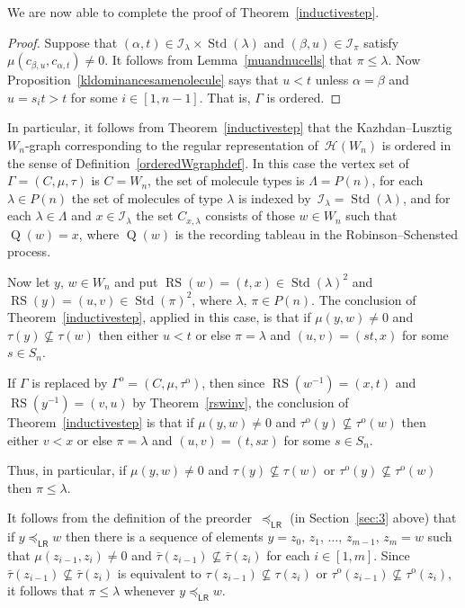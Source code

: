 \documentclass[ALCO,ThmDefs,Unicode,epreuves]{cedram}
\DeclareMathOperator{\orm}{o}
\newcommand{\opp}{^{\orm}}
\newcommand{\leftright}{_{\mathsf{LR}}}
\DeclareMathOperator{\STD}{Std}
\DeclareMathOperator{\RS}{RS}
\DeclareMathOperator{\RSQ}{Q}
\begin{document}
We are now able to complete the proof of Theorem~\ref{inductivestep}.

\begin{proof}
Suppose that $(\alpha,t)\in\mathcal{I}_{\lambda}\times\STD(\lambda)$ and
$(\beta,u)\in\mathcal{I}_{\pi}$ satisfy
$\mu(c_{\beta,u},c_{\alpha,t}) \neq 0$. It follows from
Lemma~\ref{muandnucells} that $\pi\leqslant\lambda$. Now
Proposition~\ref{kldominancesamenolecule} says that
$u < t$ unless $\alpha=\beta$ and $u=s_i t>t$ for
some $i\in[1,n-1]$. That is, $\Gamma$ is ordered.
\end{proof}

\begin{rema}\label{orderedregular}
In particular, it follows from Theorem~\ref{inductivestep} that the
Kazhdan--Lusztig $W_n$-graph corresponding to the regular representation
of~$\mathcal{H}(W_n)$ is ordered in the sense of Definition~\ref{orderedWgraphdef}.
In this case the vertex set of $\Gamma=(C,\mu,\tau)$ is $C=W_n$, the set
of molecule types is $\Lambda=P(n)$, for each $\lambda\in P(n)$ the set of
molecules of type $\lambda$ is indexed by~$\mathcal{I}_\lambda=\STD(\lambda)$,
and for each $\lambda\in\Lambda$ and $x\in\mathcal{I}_\lambda$ the
set $C_{x,\lambda}$ consists of those $w\in W_n$ such that
$\RSQ(w)=x$, where $\RSQ(w)$ is the recording tableau in the Robinson--Schensted
process.

Now let $y,\,w\in W_n$ and put $\RS(w)=(t,x)\in\STD(\lambda)^2$ and
$\RS(y)=(u,v)\in\STD(\pi)^2$, where $\lambda,\,\pi\in P(n)$.
The conclusion of Theorem~\ref{inductivestep}, applied in this case, is that
if $\mu(y,w)\ne 0$ and $\tau(y)\nsubseteq\tau(w)$ then either $u<t$ or
else $\pi=\lambda$ and $(u,v)=(st,x)$ for some $s\in S_n$.

If $\Gamma$ is replaced by $\Gamma\opp=(C,\mu,\tau\opp)$, then since
$\RS(w^{-1})=(x,t)$ and $\RS(y^{-1})=(v,u)$ by Theorem~\ref{rswinv},
the conclusion of Theorem~\ref{inductivestep} is that if $\mu(y,w)\ne 0$ and
$\tau\opp(y)\nsubseteq\tau\opp(w)$ then either $v<x$ or
else $\pi=\lambda$ and $(u,v)=(t,sx)$ for some $s\in S_n$.

Thus, in particular, if $\mu(y,w)\neq 0$ and $\tau(y)\nsubseteq\tau(w)$ or
$\tau\opp(y)\nsubseteq\tau\opp(w)$ then $\pi\leq\lambda$.

It follows from the definition of the preorder~$\preceq\leftright$ (in
Section~\ref{sec:3} above) that if $y\preceq\leftright w$
then there is a sequence of elements
 $y=z_0,\, z_1,\, \ldots,\, z_{m-1},\, z_m=w$ such that $\mu(z_{i-1},z_i)\ne 0$
and $\bar\tau(z_{i-1})\nsubseteq\bar\tau(z_i)$ for
each $i\in[1,m]$. Since $\bar\tau(z_{i-1})\nsubseteq\bar \tau(z_i)$ is equivalent
to $\tau(z_{i-1})\nsubseteq\tau(z_i)$ or $\tau\opp(z_{i-1})\nsubseteq\tau\opp(z_i)$,
it follows that $\pi\leqslant\lambda$ whenever $y\preceq\leftright w$.
\end{rema}
\end{document}
